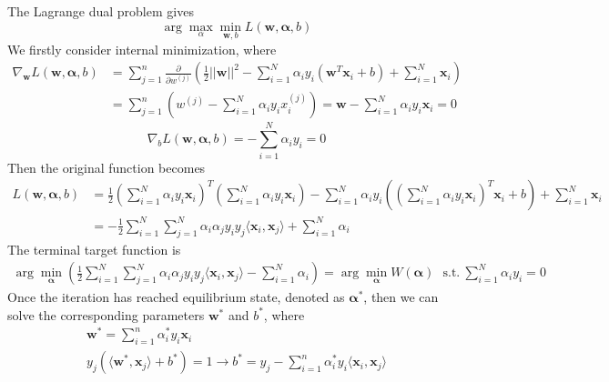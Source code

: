 \documentclass[12pt]{article}
\begin{document}
The Lagrange dual problem gives
\begin{equation}
    \arg \max_{\alpha} \min_{\bm{w}, b} L(\bm{w}, \bm{\alpha}, b)
\end{equation}
We firstly consider internal minimization, where
\begin{equation}
\begin{aligned}
    \nabla_{\bm{w}} L(\bm{w}, \bm{\alpha}, b) &= \sum_{j=1}^n \frac{\partial}{\partial w^{(j)}} \left(\frac{1}{2}||\bm{w}||^2 - \sum_{i=1}^N \alpha_i y_i (\bm{w}^T \bm{x}_i + b) + \sum_{i=1}^N \bm{x}_i\right) \\
    &= \sum_{j=1}^n \left(w^{(j)} - \sum_{i=1}^N \alpha_i y_i x_i^{(j)} \right)= \bm{w} - \sum_{i=1}^N \alpha_i y_i \bm{x}_i = 0
\end{aligned}
\end{equation}
\begin{equation}
    \nabla_{b} L(\bm{w}, \bm{\alpha}, b) = -\sum_{i=1}^N \alpha_i y_i = 0
\end{equation}
Then the original function becomes
\begin{equation}
\begin{aligned}
    L(\bm{w}, \bm{\alpha}, b) &= \frac{1}{2}\left( \sum_{i=1}^N \alpha_i y_i \bm{x}_i\right)^T \left( \sum_{i=1}^N \alpha_i y_i \bm{x}_i\right)  - \sum_{i=1}^N \alpha_i y_i \left(\left(\sum_{i=1}^N \alpha_i y_i \bm{x}_i\right)^T \bm{x}_i + b \right) + \sum_{i=1}^N \bm{x}_i \\
    &= -\frac{1}{2} \sum_{i=1}^N \sum_{j=1}^N \alpha_i \alpha_j y_i y_j \langle \bm{x}_i, \bm{x}_j \rangle + \sum_{i=1}^N \alpha_i
\end{aligned}
\end{equation}
The terminal target function is
\begin{gather}
    \boxed{ \arg \min_{\bm{\alpha}} \left(\frac{1}{2} \sum_{i=1}^N \sum_{j=1}^N \alpha_i \alpha_j y_i y_j \langle \bm{x}_i, \bm{x}_j \rangle - \sum_{i=1}^N \alpha_i \right) = \arg \min_{\bm{\alpha}} W(\bm{\alpha})~~~ \text{s.t.}~\sum_{i=1}^N \alpha_i y_i = 0}
\end{gather}
Once the iteration has reached equilibrium state, denoted as $\bm{\alpha}^*$, then we can solve the corresponding parameters $\bm{w}^*$ and $b^*$, where
\begin{gather}
    \bm{w}^* = \sum_{i=1}^n \alpha_i^* y_i \bm{x}_i \\
    y_j(\langle \bm{w}^*, \bm{x}_j \rangle + b^*) = 1 \rightarrow b^* = y_j - \sum_{i=1}^n \alpha_i^* y_i \langle \bm{x}_i, \bm{x}_j \rangle
\end{gather}
\end{document}
